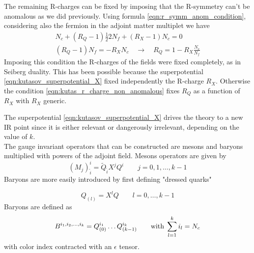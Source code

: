 The remaining R-charges can be fixed by imposing that the R-symmetry can't be anomalous as we did previously.
Using formula \eqref{eqn:r_symm_anom_condition}, considering also the fermion in the adjoint matter multiplet we have
\begin{align}
N_c + (R_Q -1) \frac{1}{2} 2 N_f + (R_X - 1 ) N_c = 0 
\label{eqn:kutas_r_charge_non_anomalous}
\\
(R_Q - 1 ) N_f = - R_X N_c \quad \longrightarrow \quad R_Q = 1 - R_X \frac{N_c}{N_f}
\end{align}
Imposing this condition the R-charges of the fields were fixed completely, as in Seiberg duality.
This has been possible because the superpotential 
\eqref{eqn:kutasov_superpotential_X}
fixed independently the R-charge $R_X$.
Otherwise the condition \eqref{eqn:kutas_r_charge_non_anomalous} fixes $R_Q$ as a function of $R_X$ with $R_X$ generic.
\\
\begin{comment}
It is interesting to note that the condition \eqref{eqn:kutas_r_charge_non_anomalous} can be found independently by requiring that the $\beta$ function has a fixed point
\begin{align}
0 =\beta{g} \sim & 3 T(Adj) - \sum_i T(Repr_i) (1- \gamma_i) = \\
 = & \,  T(Adj) + \sum_i T(Repr_i) ( R_i -1) = 0
\end{align}
where we have used $\gamma_i + 2 = 2 D_i \;$ for chiral fields and $ \; R_i = \frac{3}{2} D_i$ for chiral fields at the superconformal fixed point.
\\
\end{comment}
The superpotential \eqref{eqn:kutasov_superpotential_X} drives the theory to a new IR point since it is either relevant or dangerously irrelevant, depending on the value of $k$.
\\
The gauge invariant operators that can be constructed are mesons and baryons multiplied with powers of the adjoint field.
Mesons operators are given by
\begin{equation}
 (M_j)^i_{\tilde{i}} = \tilde{Q}_{\tilde{i}} X^{j} Q^i \qquad j = 0,1,\dotsc,k-1
\end{equation}
Baryons are more easily introduced by first defining "dressed quarks"

\begin{equation}
 Q_{(l)} = X^{l} Q \qquad l =0, \dotsc, k-1
\end{equation}
Baryons are defined as
\begin{equation}
B^{i_1, i_2, \dotsc , i_k} = Q_{(0)}^{i_1} \dots Q_{(k-1)}^{i_k} \qquad \hbox{with} \; \sum_{l=1}^k i_l = N_c 
\end{equation}
with color index contracted with an $\epsilon$ tensor.


